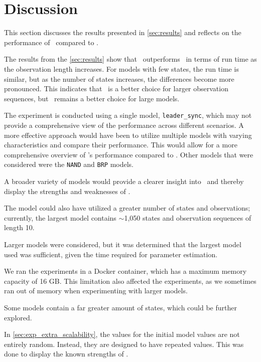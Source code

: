 \section{Discussion}\label{sec:discussion}
This section discusses the results presented in \autoref{sec:results} and reflects on the performance of \Cupaal\ compared to \Jajapy.

The results from the \autoref{sec:results} show that \Cupaal\ outperforms \Jajapy\ in terms of run time as the observation length increases.
For models with few states, the run time is similar, but as the number of states increases, the differences become more pronounced.
This indicates that \Cupaal\ is a better choice for larger observation sequences, but \Jajapy\ remains a better choice for large models.

The experiment is conducted using a single model, \texttt{leader\_sync}, which may not provide a comprehensive view of the performance across different scenarios.
A more effective approach would have been to utilize multiple models with varying characteristics and compare their performance.
This would allow for a more comprehensive overview of \Cupaal 's performance compared to \Jajapy.
Other models that were considered were the \texttt{NAND} and \texttt{BRP} models.

A broader variety of models would provide a clearer insight into \Cupaal\ and thereby display the strengths and weaknesses of \Cupaal.


The model could also have utilized a greater number of states and observations; currently, the largest model contains $\sim$1,050 states and observation sequences of length 10.

Larger models were considered, but it was determined that the largest model used was sufficient, given the time required for parameter estimation.

We ran the experiments in a Docker container, which has a maximum memory capacity of 16 GB. This limitation also affected the experiments, as we sometimes ran out of memory when experimenting with larger models.

Some models contain a far greater amount of states, which could be further explored.

In \autoref{sec:exp_extra_scalability}, the values for the initial model values are not entirely random. Instead, they are designed to have repeated values.
This was done to display the known strengths of \Cupaal.

